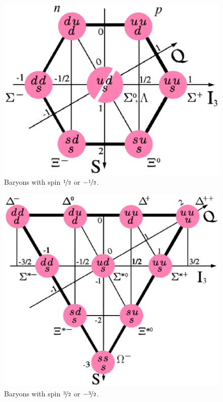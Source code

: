 \documentclass[12pt,a4paper]{article}
\numberwithin{equation}{section}
\numberwithin{figure}{section}
\numberwithin{table}{section}
\begin{document}
\begin{figure}\begin{center}
\includegraphics[scale=0.5]{isospin1.eps}
\caption{Baryons with spin $\nicefrac{1}{2}$ or $-\nicefrac{1}{2}$.}\label{fig:isospin1}
\end{center}\end{figure}

\begin{figure}\begin{center}
\includegraphics[scale=0.5]{isospin2.eps}
\caption{Baryons with spin $\nicefrac{3}{2}$ or $-\nicefrac{3}{2}$.}\label{fig:isospin2}
\end{center}\end{figure}
\end{document}
